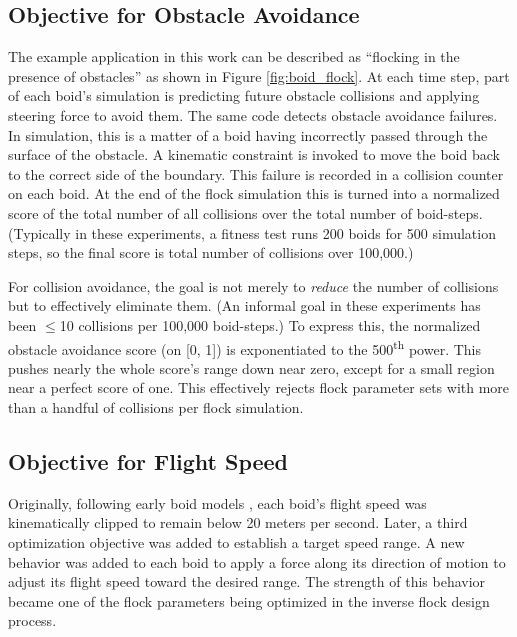 \documentclass[letterpaper]{article}
\begin{document}
\subsection{Objective for Obstacle Avoidance}
\label{subsec:avoidance_objective}

The example application in this work can be described as ``flocking in the presence of obstacles'' as shown in Figure \ref{fig:boid_flock}. At each time step, part of each boid's simulation is predicting future obstacle collisions and applying steering force to avoid them. The same code detects obstacle avoidance failures. In simulation, this is a matter of a boid having incorrectly passed through the surface of the obstacle. A kinematic constraint is invoked to move the boid back to the correct side of the boundary. This failure is recorded in a collision counter on each boid. At the end of the flock simulation this is turned into a normalized score of the total number of all collisions over the total number of boid-steps. (Typically in these experiments, a fitness test runs 200 boids for 500 simulation steps, so the final score is total number of collisions over 100,000.) 

For collision avoidance, the goal is not merely to \textit{reduce} the number of collisions but to effectively eliminate them. (An informal goal in these experiments has been {$\leq$}10 collisions per 100,000 boid-steps.) To express this, the normalized obstacle avoidance score (on [0, 1]) is exponentiated to the 500\textsuperscript{th} power. This pushes nearly the whole score's range down near zero, except for a small region near a perfect score of one. This effectively rejects flock parameter sets with more than a handful of collisions per flock simulation.

\subsection{Objective for Flight Speed}
\label{subsec:speed_objective}

Originally, following early boid models \citep{reynolds_flocks_1987}, each boid's flight speed was kinematically clipped to remain below 20 meters per second. Later, a third optimization objective was added to establish a target speed range. A new behavior was added to each boid to apply a force along its direction of motion to adjust its flight speed toward the desired range. The strength of this behavior became one of the flock parameters being optimized in the inverse flock design process.
\end{document}
